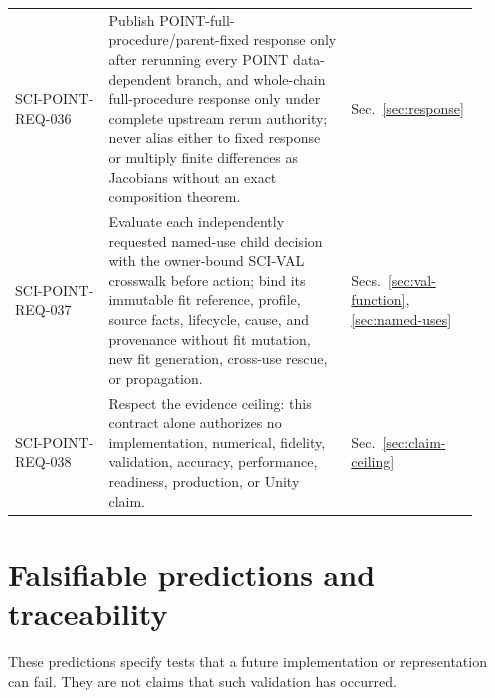 \begin{longtable}{@{}p{0.20\linewidth}p{0.52\linewidth}p{0.20\linewidth}@{}}
SCI-POINT-REQ-036 & Publish POINT-full-procedure/parent-fixed response only after rerunning every POINT data-dependent branch, and whole-chain full-procedure response only under complete upstream rerun authority; never alias either to fixed response or multiply finite differences as Jacobians without an exact composition theorem. & Sec.~\ref{sec:response} \\
SCI-POINT-REQ-037 & Evaluate each independently requested named-use child decision with the owner-bound SCI-VAL crosswalk before action; bind its immutable fit reference, profile, source facts, lifecycle, cause, and provenance without fit mutation, new fit generation, cross-use rescue, or propagation. & Secs.~\ref{sec:val-function}, \ref{sec:named-uses} \\
SCI-POINT-REQ-038 & Respect the evidence ceiling: this contract alone authorizes no implementation, numerical, fidelity, validation, accuracy, performance, readiness, production, or Unity claim. & Sec.~\ref{sec:claim-ceiling} \\
\bottomrule
\end{longtable}
\normalsize

\section{Falsifiable predictions and traceability}\label{sec:predictions}

These predictions specify tests that a future implementation or representation
can fail. They are not claims that such validation has occurred.

